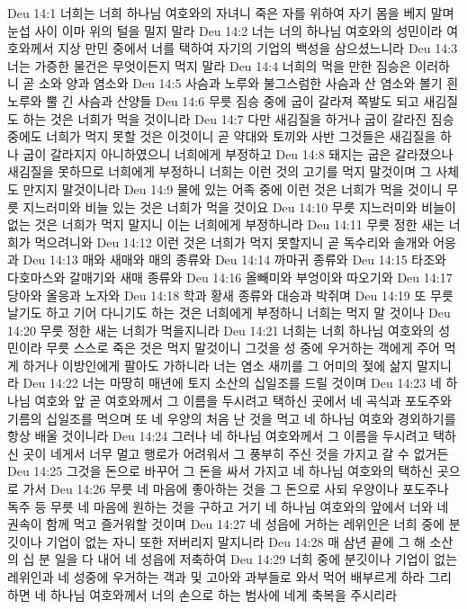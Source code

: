 Deu 14:1  너희는 너희 하나님 여호와의 자녀니 죽은 자를 위하여 자기 몸을 베지 말며 눈섭 사이 이마 위의 털을 밀지 말라
Deu 14:2  너는 너의 하나님 여호와의 성민이라 여호와께서 지상 만민 중에서 너를 택하여 자기의 기업의 백성을 삼으셨느니라
Deu 14:3  너는 가증한 물건은 무엇이든지 먹지 말라
Deu 14:4  너희의 먹을 만한 짐승은 이러하니 곧 소와 양과 염소와
Deu 14:5  사슴과 노루와 불그스럼한 사슴과 산 염소와 볼기 흰 노루와 뿔 긴 사슴과 산양들
Deu 14:6  무릇 짐승 중에 굽이 갈라져 쪽발도 되고 새김질도 하는 것은 너희가 먹을 것이니라
Deu 14:7  다만 새김질을 하거나 굽이 갈라진 짐승 중에도 너희가 먹지 못할 것은 이것이니 곧 약대와 토끼와 사반 그것들은 새김질을 하나 굽이 갈라지지 아니하였으니 너희에게 부정하고
Deu 14:8  돼지는 굽은 갈라졌으나 새김질을 못하므로 너희에게 부정하니 너희는 이런 것의 고기를 먹지 말것이며 그 사체도 만지지 말것이니라
Deu 14:9  물에 있는 어족 중에 이런 것은 너희가 먹을 것이니 무릇 지느러미와 비늘 있는 것은 너희가 먹을 것이요
Deu 14:10  무릇 지느러미와 비늘이 없는 것은 너희가 먹지 말지니 이는 너희에게 부정하니라
Deu 14:11  무릇 정한 새는 너희가 먹으려니와
Deu 14:12  이런 것은 너희가 먹지 못할지니 곧 독수리와 솔개와 어응과
Deu 14:13  매와 새매와 매의 종류와
Deu 14:14  까마귀 종류와
Deu 14:15  타조와 다호마스와 갈매기와 새매 종류와
Deu 14:16  올빼미와 부엉이와 따오기와
Deu 14:17  당아와 올응과 노자와
Deu 14:18  학과 황새 종류와 대승과 박쥐며
Deu 14:19  또 무릇 날기도 하고 기어 다니기도 하는 것은 너희에게 부정하니 너희는 먹지 말 것이나
Deu 14:20  무릇 정한 새는 너희가 먹을지니라
Deu 14:21  너희는 너희 하나님 여호와의 성민이라 무릇 스스로 죽은 것은 먹지 말것이니 그것을 성 중에 우거하는 객에게 주어 먹게 하거나 이방인에게 팔아도 가하니라 너는 염소 새끼를 그 어미의 젖에 삶지 말지니라
Deu 14:22  너는 마땅히 매년에 토지 소산의 십일조를 드릴 것이며
Deu 14:23  네 하나님 여호와 앞 곧 여호와께서 그 이름을 두시려고 택하신 곳에서 네 곡식과 포도주와 기름의 십일조를 먹으며 또 네 우양의 처음 난 것을 먹고 네 하나님 여호와 경외하기를 항상 배울 것이니라
Deu 14:24  그러나 네 하나님 여호와께서 그 이름을 두시려고 택하신 곳이 네게서 너무 멀고 행로가 어려워서 그 풍부히 주신 것을 가지고 갈 수 없거든
Deu 14:25  그것을 돈으로 바꾸어 그 돈을 싸서 가지고 네 하나님 여호와의 택하신 곳으로 가서
Deu 14:26  무릇 네 마음에 좋아하는 것을 그 돈으로 사되 우양이나 포도주나 독주 등 무릇 네 마음에 원하는 것을 구하고 거기 네 하나님 여호와의 앞에서 너와 네 권속이 함께 먹고 즐거워할 것이며
Deu 14:27  네 성읍에 거하는 레위인은 너희 중에 분깃이나 기업이 없는 자니 또한 저버리지 말지니라
Deu 14:28  매 삼년 끝에 그 해 소산의 십 분 일을 다 내어 네 성읍에 저축하여
Deu 14:29  너희 중에 분깃이나 기업이 없는 레위인과 네 성중에 우거하는 객과 및 고아와 과부들로 와서 먹어 배부르게 하라 그리하면 네 하나님 여호와께서 너의 손으로 하는 범사에 네게 축복을 주시리라
